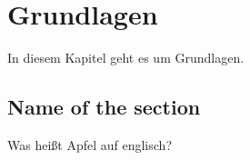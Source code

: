 \chapter{Grundlagen}\label{chap:Grundlagen}
In diesem Kapitel geht es um Grundlagen.
\section{Name of the section}
Was heißt Apfel auf englisch?
